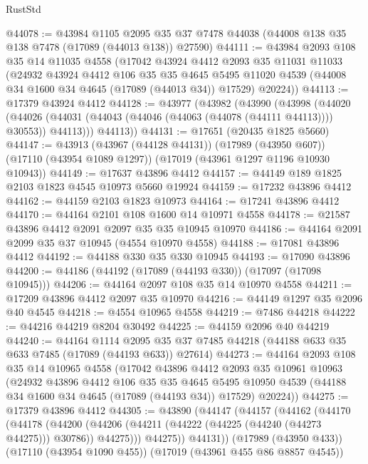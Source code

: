 \begin{lexlean}{RustStd}
\begin{coremodule}
@44078 := @43984
    @1105
    @2095
    @35
    @37
    @7478
    @44038
    (@44008 @138 @35 @138 @7478 (@17089 (@44013 @138)) @27590)
@44111 := @43984
    @2093
    @108
    @35
    @14
    @11035
    @4558
    (@17042
      @43924
      @4412
      @2093
      @35
      @11031
      @11033
      (@24932
        @43924
        @4412
        @106
        @35
        @35
        @4645
        @5495
        @11020
        @4539
        (@44008 @34 @1600 @34 @4645 (@17089 (@44013 @34)) @17529)
        @20224))
@44113 := @17379 @43924 @4412
@44128 := @43977
    (@43982
      (@43990
        (@43998
          (@44020
            (@44026 (@44031 (@44043 (@44046 (@44063 (@44078 (@44111 @44113)))) @30553)) @44113)))
        @44113))
@44131 := @17651 (@20435 @1825 @5660)
@44147 := @43913
    (@43967 (@44128 @44131))
    (@17989 (@43950 @607))
    (@17110 (@43954 @1089 @1297))
    (@17019 (@43961 @1297 @1196 @10930 @10943))
@44149 := @17637 @43896 @4412
@44157 := @44149 @189 @1825 @2103 @1823 @4545 @10973 @5660 @19924
@44159 := @17232 @43896 @4412
@44162 := @44159 @2103 @1823 @10973
@44164 := @17241 @43896 @4412
@44170 := @44164 @2101 @108 @1600 @14 @10971 @4558
@44178 := @21587 @43896 @4412 @2091 @2097 @35 @35 @10945 @10970
@44186 := @44164 @2091 @2099 @35 @37 @10945 (@4554 @10970 @4558)
@44188 := @17081 @43896 @4412
@44192 := @44188 @330 @35 @330 @10945
@44193 := @17090 @43896
@44200 := @44186 (@44192 (@17089 (@44193 @330)) (@17097 (@17098 @10945)))
@44206 := @44164 @2097 @108 @35 @14 @10970 @4558
@44211 := @17209 @43896 @4412 @2097 @35 @10970
@44216 := @44149 @1297 @35 @2096 @40 @4545
@44218 := @4554 @10965 @4558
@44219 := @7486 @44218
@44222 := @44216 @44219 @8204 @30492
@44225 := @44159 @2096 @40 @44219
@44240 := @44164
    @1114
    @2095
    @35
    @37
    @7485
    @44218
    (@44188 @633 @35 @633 @7485 (@17089 (@44193 @633)) @27614)
@44273 := @44164
    @2093
    @108
    @35
    @14
    @10965
    @4558
    (@17042
      @43896
      @4412
      @2093
      @35
      @10961
      @10963
      (@24932
        @43896
        @4412
        @106
        @35
        @35
        @4645
        @5495
        @10950
        @4539
        (@44188 @34 @1600 @34 @4645 (@17089 (@44193 @34)) @17529)
        @20224))
@44275 := @17379 @43896 @4412
@44305 := @43890
    (@44147
      (@44157
        (@44162
          (@44170
            (@44178
              (@44200 (@44206 (@44211 (@44222 (@44225 (@44240 (@44273 @44275))) @30786)) @44275)))
            @44275))
        @44131))
    (@17989 (@43950 @433))
    (@17110 (@43954 @1090 @455))
    (@17019 (@43961 @455 @86 @8857 @4545))

\end{coremodule}
\end{lexlean}
